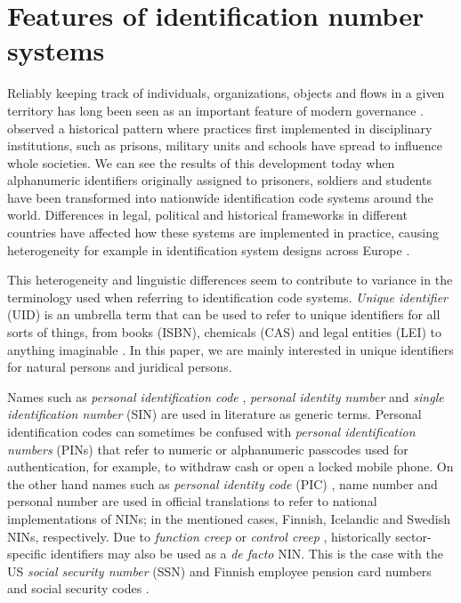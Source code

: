 \section{Features of identification number systems}\label{features-of-identification-number-systems}

Reliably keeping track of individuals, organizations, objects and flows in a given territory has long been seen as an important feature of modern governance \citep{dodge2005}. \citet[115-120]{foucault7778} observed a historical pattern where practices first implemented in disciplinary institutions, such as prisons, military units and schools have spread to influence whole societies. We can see the results of this development today when alphanumeric identifiers originally assigned to prisoners, soldiers and students have been transformed into nationwide identification code systems around the world. Differences in legal, political and historical frameworks in different countries have affected how these systems are implemented in practice, causing heterogeneity for example in identification system designs across Europe \citep{otjacques2007}.

This heterogeneity and linguistic differences seem to contribute to variance in the terminology used when referring to identification code systems. \emph{Unique identifier} (UID) is an umbrella term that can be used to refer to unique identifiers for all sorts of things, from books (ISBN), chemicals (CAS) and legal entities (LEI) to anything imaginable \citep[see][]{dodge2005}. In this paper, we are mainly interested in unique identifiers for natural persons and juridical persons.

Names such as \emph{personal identification code} \citep{dodge2005}, \emph{personal identity number} \citep{alastalo2022} and \emph{single identification number} (SIN) \citep{otjacques2007} are used in literature as generic terms. Personal identification codes can sometimes be confused with \emph{personal identification numbers} (PINs) that refer to numeric or alphanumeric passcodes used for authentication, for example, to withdraw cash or open a locked mobile phone. On the other hand names such as \emph{personal identity code} (PIC) \citep{hetudvv, sund2012}, name number \citep{watson2010} and personal number \citep{scb2016} are used in official translations to refer to national implementations of NINs; in the mentioned cases, Finnish, Icelandic and Swedish NINs, respectively. Due to \emph{function creep} \citep[see][]{brensinger2021, alastalo2022} or \emph{control creep} \citep[see][]{dodge2005}, historically sector-specific identifiers may also be used as a \emph{de facto} NIN. This is the case with the US \emph{social security number} (SSN) \citep{brensinger2021} and Finnish employee pension card numbers and social security codes \citep{alastalo2022}.


